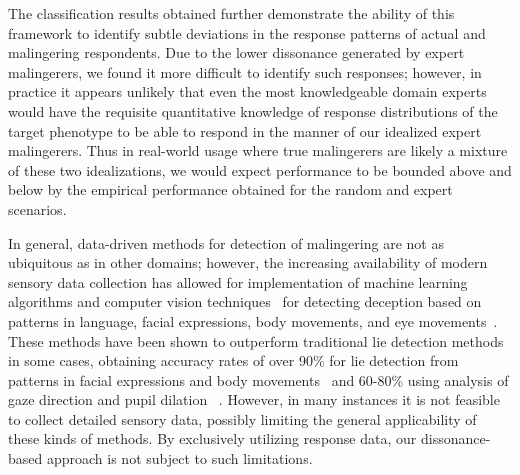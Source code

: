 \documentclass[onecolumn,10pt]{IEEEtran}
\begin{document}
The classification results obtained further demonstrate the ability of this framework to identify subtle deviations in the response patterns of actual and malingering respondents. Due to the lower dissonance generated by expert malingerers, we found it more difficult to identify such responses; however, in practice it appears unlikely that even the most knowledgeable domain experts would have the requisite quantitative knowledge of response distributions of the target phenotype to be able to respond in the manner of our idealized expert malingerers. Thus in real-world usage where true malingerers are likely a mixture of these two idealizations, we would expect performance to be bounded above and below by the empirical performance obtained for the random and expert scenarios.

In general, data-driven methods for detection of malingering are not as ubiquitous as in other domains; however, the increasing availability of modern sensory data collection has allowed for implementation of machine learning algorithms and computer vision techniques~\cite{Chan2018, Wang2020, Lee2019} for detecting deception based on patterns in language, facial expressions, body movements, and eye movements~\cite{Yu2018, Ducharme2017}. These methods have been shown to outperform traditional lie detection methods in some cases, obtaining accuracy rates of over 90\% for lie detection from patterns in facial expressions and body movements~\cite{Ekman1992,Yu2018} and 60-80\% using analysis of gaze direction and pupil dilation~\cite{Ducharme2017}%
. However, in many instances it is not feasible to collect detailed sensory data, possibly limiting the general applicability of these kinds of methods. By exclusively utilizing response data, our dissonance-based approach is not subject to such limitations.

\end{document}
